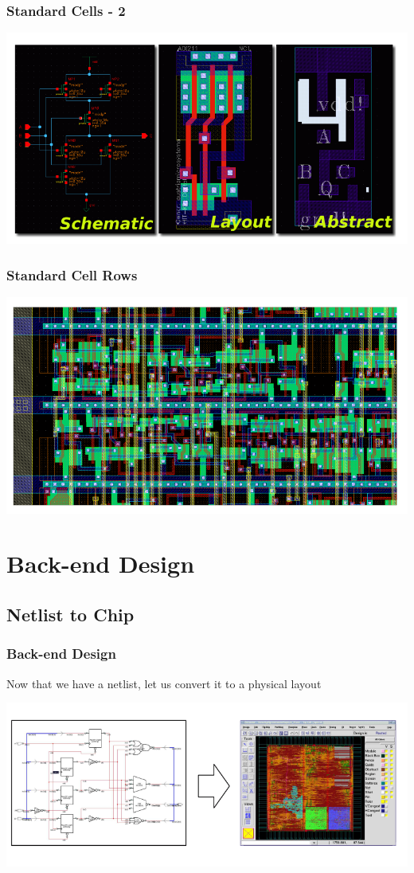 \documentclass[compress]{beamer}
\begin{document}
\begin{frame}
	\frametitle{Standard Cells - 2}
	\begin{center}
		\includegraphics[width=\textwidth]{cell_2}
	\end{center}
\end{frame}
\begin{frame}
	\frametitle{Standard Cell Rows}
	\begin{center}
		\includegraphics[width=\textwidth]{row}
	\end{center}
\end{frame}
\section[Back]{Back-end Design}
\subsection[Goals]{Netlist to Chip}
\begin{frame}
	\frametitle{Back-end Design}
		Now that we have a netlist, let us convert it to a physical layout
	\begin{center}
		\includegraphics[width=\textwidth]{back}
	\end{center}
\end{frame}
\end{document}

